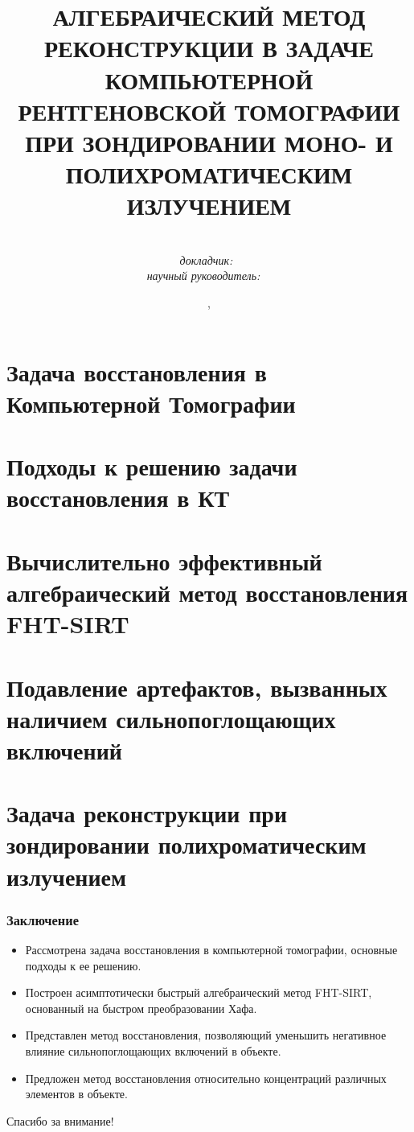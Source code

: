 \documentclass[12pt]{beamer}
\title{\small{
  АЛГЕБРАИЧЕСКИЙ МЕТОД РЕКОНСТРУКЦИИ В ЗАДАЧЕ КОМПЬЮТЕРНОЙ РЕНТГЕНОВСКОЙ ТОМОГРАФИИ ПРИ ЗОНДИРОВАНИИ МОНО- И ПОЛИХРОМАТИЧЕСКИМ ИЗЛУЧЕНИЕМ
}}
\author{\small{%
\ \vspace{30pt} \\
\emph{докладчик:}~\thesisAuthorShort\\%
\emph{научный руководитель:}~\supervisorRegaliaShort~\supervisorFioShort}\\%
\vspace{30pt}%
\vspace{20pt}%
}
\date{\small{\thesisCity, \thesisYear}}
\begin{document}
\maketitle

\section{Задача восстановления в Компьютерной Томографии}


\section{Подходы к решению задачи восстановления в КТ}


\section{Вычислительно эффективный алгебраический метод восстановления FHT-SIRT}


\section{Подавление артефактов, вызванных наличием сильнопоглощающих включений}


\section{Задача реконструкции при зондировании полихроматическим излучением}



\begin{frame}
\frametitle{Заключение}
\begin{itemize}
  \item Рассмотрена задача восстановления в компьютерной томографии, основные подходы к ее решению.
  \item Построен асимптотически быстрый алгебраический метод FHT-SIRT, основанный на быстром преобразовании Хафа.
  \item Представлен метод восстановления, позволяющий уменьшить негативное влияние сильнопоглощающих включений в объекте.
  \item Предложен метод восстановления относительно концентраций различных элементов в объекте.
\end{itemize}
\end{frame}

\begin{frame}
\centering
\large {Спасибо за внимание!}
\end{frame}
\end{document}
